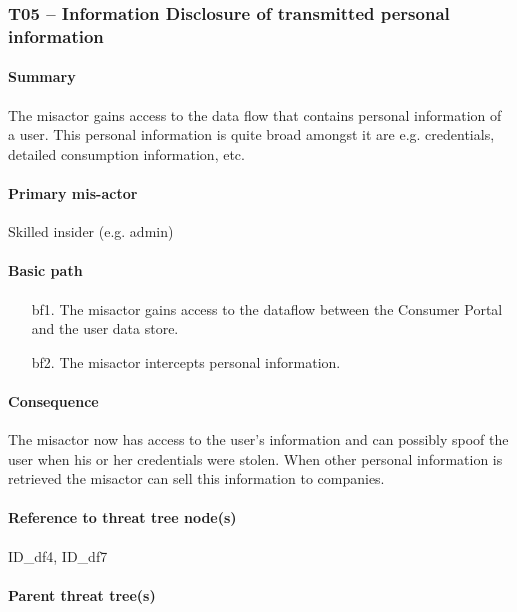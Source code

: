 \subsubsection{T05 -- Information Disclosure of transmitted personal information}
\label{threats:t05}

\paragraph{Summary}

\npar The misactor gains access to the data flow that contains personal
information of a user. This personal information is quite broad amongst it are
e.g. credentials, detailed consumption information, etc.

\paragraph{Primary mis-actor}

\npar Skilled insider (e.g. admin)

\paragraph{Basic path}
\begin{enumerate}
	\item[bf1.] The misactor gains access to the dataflow between the Consumer
	Portal and the user data store.
    \item[bf2.] The misactor intercepts personal information.
\end{enumerate}

\paragraph{Consequence}

\npar The misactor now has access to the user's information and can possibly
spoof the user when his or her credentials were stolen. When other personal
information is retrieved the misactor can sell this information to companies.

\paragraph{Reference to threat tree node(s)}

ID\_df4, ID\_df7

\paragraph{Parent threat tree(s)}

